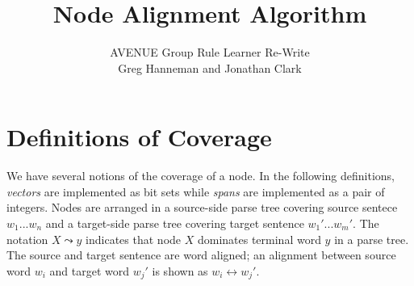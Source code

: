 \documentclass{article}
\title{Node Alignment Algorithm}
\author{AVENUE Group Rule Learner Re-Write \\
        Greg Hanneman and Jonathan Clark}
\begin{document}
\maketitle


\section{Definitions of Coverage}

We have several notions of the coverage of a node.  In the following definitions, {\it vectors} are implemented as bit sets while {\it spans} are implemented as a pair of integers.  Nodes are arranged in a source-side parse tree covering source sentece $w_1 ... w_n$ and a target-side parse tree covering target sentence $w_1' ... w_m'$.  The notation $X \leadsto y$ indicates that node $X$ dominates terminal word $y$ in a parse tree.  The source and target sentence are word aligned; an alignment between source word $w_i$ and target word $w_j'$ is shown as $w_i \leftrightarrow w_j'$.
\end{document}
